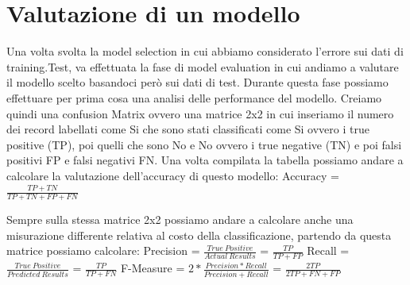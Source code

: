 \documentclass[14pt]{extreport}
\begin{document}
\section{Valutazione di un modello}

Una volta svolta la model selection in cui abbiamo considerato l'errore sui dati di training.Test, va effettuata la fase di model evaluation in cui andiamo a valutare il modello scelto basandoci però sui dati di test.
Durante questa fase possiamo effettuare per prima cosa una analisi delle performance del modello. 
Creiamo quindi una confusion Matrix ovvero una matrice 2x2 in cui inseriamo il numero dei record labellati come Si che sono stati classificati come Si ovvero i true positive (TP), poi quelli che sono No e No ovvero i true negative (TN) e poi falsi positivi FP e falsi negativi FN.
Una volta compilata la tabella possiamo andare a calcolare la valutazione dell'accuracy di questo modello:
Accuracy = $\frac{TP+TN}{TP+TN+FP+FN}$

Sempre sulla stessa matrice 2x2 possiamo andare a calcolare anche una misurazione differente relativa al costo della classificazione, partendo da questa matrice possiamo calcolare:
\newline
Precision = $\frac{True\ Positive}{Actual\ Results}$ = $\frac{TP}{TP+FP}$
\newline
Recall = $\frac{True\ Positive}{Predicted\ Results}$ = $\frac{TP}{TP+FN}$
\newline 
F-Measure = $2*\frac{Precision*Recall}{Precision+Recall}$ = $\frac{2TP}{2TP+FN+FP}$
\end{document}
